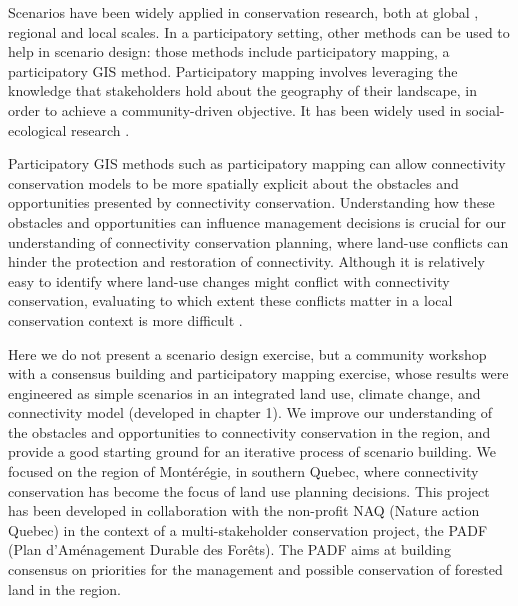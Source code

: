 Scenarios have been widely applied in conservation research, both at global \citep{tscharntke_global_2012, brussaard_reconciling_2010}, regional and local \citep{carlson_scenario_2011, delevaux_scenario_2018} scales. In a participatory setting, other methods can be used to help in scenario design: those methods include participatory mapping, a participatory GIS method. Participatory mapping involves leveraging the knowledge that stakeholders hold about the geography of their landscape, in order to achieve a community-driven objective. It has been widely used in social-ecological research \citep{plieninger_assessing_2013, lynam_review_2007}. 

Participatory GIS methods such as participatory mapping can allow connectivity conservation models to be more spatially explicit about the obstacles and opportunities presented by connectivity conservation. Understanding how these obstacles and opportunities can influence management decisions is crucial for our understanding of connectivity conservation planning, where land-use conflicts can hinder the protection and restoration of connectivity. Although it is relatively easy to identify where land-use changes might conflict with connectivity conservation, evaluating to which extent these conflicts matter in a local conservation context is more difficult \cite{mitchell_monteregie_2015}.

Here we do not present a scenario design exercise, but a community workshop with a consensus building and participatory mapping exercise, whose results were engineered as simple scenarios in an integrated land use, climate change, and connectivity model (developed in chapter 1). We improve our understanding of the obstacles and opportunities to connectivity conservation in the region, and provide a good starting ground for an iterative process of scenario building. We focused on the region of Montérégie, in southern Quebec, where connectivity conservation has become the focus of land use planning decisions. This project has been developed in collaboration with the non-profit NAQ (Nature action Quebec) in the context of a multi-stakeholder conservation project, the PADF (Plan d’Aménagement Durable des Forêts). The PADF aims at building consensus on priorities for the management and possible conservation of forested land in the region.

